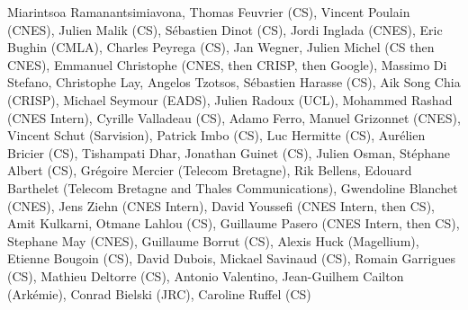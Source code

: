 Miarintsoa Ramanantsimiavona, Thomas Feuvrier (CS), Vincent Poulain (CNES), Julien Malik (CS), S\'ebastien Dinot (CS), Jordi Inglada (CNES), Eric Bughin (CMLA), Charles Peyrega (CS), Jan Wegner, Julien Michel (CS then CNES), Emmanuel Christophe (CNES, then CRISP, then Google), Massimo Di Stefano, Christophe Lay, Angelos Tzotsos, S\'ebastien Harasse (CS), Aik Song Chia (CRISP), Michael Seymour (EADS), Julien Radoux (UCL), Mohammed Rashad (CNES Intern), Cyrille Valladeau (CS), Adamo Ferro, Manuel Grizonnet (CNES), Vincent Schut (Sarvision), Patrick Imbo (CS), Luc Hermitte (CS), Aur\'elien Bricier (CS), Tishampati Dhar, Jonathan Guinet (CS), Julien Osman, St\'ephane Albert (CS), Gr\'egoire Mercier (Telecom Bretagne), Rik Bellens, Edouard Barthelet (Telecom Bretagne and Thales Communications), Gwendoline Blanchet (CNES), Jens Ziehn (CNES Intern), David Youssefi  (CNES Intern, then CS), Amit Kulkarni, Otmane Lahlou (CS), Guillaume Pasero (CNES Intern, then CS), Stephane May (CNES), Guillaume Borrut (CS), Alexis Huck (Magellium), Etienne Bougoin (CS), David Dubois, Mickael Savinaud (CS), Romain Garrigues (CS), Mathieu Deltorre (CS), Antonio Valentino, Jean-Guilhem Cailton (Ark\'emie), Conrad Bielski (JRC), Caroline Ruffel (CS)